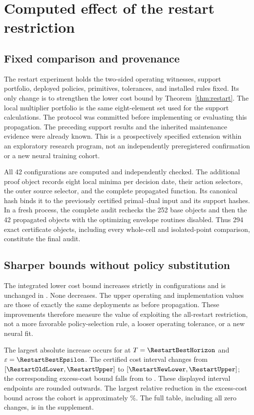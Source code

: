 \section{Computed effect of the restart restriction}\label{sec:restart-results}
\subsection{Fixed comparison and provenance}
The restart experiment holds the two-sided operating witnesses, support portfolio, deployed policies, primitives, tolerances, and installed rules fixed. Its only change is to strengthen the lower cost bound by Theorem~\ref{thm:restart}. The local multiplier portfolio is the same eight-element set used for the support calculations. The protocol was committed before implementing or evaluating this propagation. The preceding support results and the inherited maintenance evidence were already known. This is a prospectively specified extension within an exploratory research program, not an independently preregistered confirmation or a new neural training cohort.

All 42 configurations are computed and independently checked. The additional proof object records eight local minima per decision date, their action selectors, the outer source selector, and the complete propagated function. Its canonical hash binds it to the previously certified primal--dual input and its support hashes. In a fresh process, the complete audit rechecks the 252 base objects and then the 42 propagated objects with the optimizing envelope routines disabled. Thus 294 exact certificate objects, including every whole-cell and isolated-point comparison, constitute the final audit.

\subsection{Sharper bounds without policy substitution}

The integrated lower cost bound increases strictly in \RestartTightened{} configurations and is unchanged in \RestartUnchanged{}. None decreases. The upper operating and implementation values are those of exactly the same deployments as before propagation. These improvements therefore measure the value of exploiting the all-restart restriction, not a more favorable policy-selection rule, a looser operating tolerance, or a new neural fit.

The largest absolute increase occurs for \RestartBestProposal{} at $T=\RestartBestHorizon$ and $\varepsilon=\RestartBestEpsilon$. The certified cost interval changes from $[\RestartOldLower,\RestartUpper]$ to $[\RestartNewLower,\RestartUpper]$; the corresponding excess-cost bound falls from \RestartOldGap{} to \RestartNewGap{}. These displayed interval endpoints are rounded outwards. The largest relative reduction in the excess-cost bound across the cohort is approximately \RestartMaxPercent\%. The full table, including all zero changes, is in the supplement.

